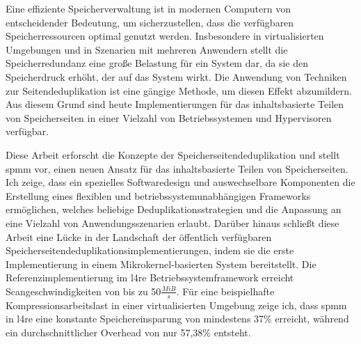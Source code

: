 Eine effiziente Speicherverwaltung ist in modernen Computern von entscheidender Bedeutung, um sicherzustellen, dass die verfügbaren Speicherressourcen optimal genutzt werden.
Insbesondere in virtualisierten Umgebungen und in Szenarien mit mehreren Anwendern stellt die Speicherredundanz eine große Belastung für ein System dar, da sie den Speicherdruck erhöht, der auf das System wirkt.
Die Anwendung von Techniken zur Seitendeduplikation ist eine gängige Methode, um diesen Effekt abzumildern.
Aus diesem Grund sind heute Implementierungen für das inhaltsbasierte Teilen von Speicherseiten in einer Vielzahl von Betriebssystemen und Hypervisoren verfügbar.

Diese Arbeit erforscht die Konzepte der Speicherseitendeduplikation und stellt \acs{spmm} vor, einen neuen Ansatz für das inhaltsbasierte Teilen von Speicherseiten.
Ich zeige, dass ein spezielles Softwaredesign und auswechselbare Komponenten die Erstellung eines flexiblen und betriebssystemunabhängigen Frameworks ermöglichen, welches beliebige Deduplikationsstrategien und die Anpassung an eine Vielzahl von Anwendungsszenarien erlaubt.
Darüber hinaus schließt diese Arbeit eine Lücke in der Landschaft der öffentlich verfügbaren Speicherseitendeduplikationsimplementierungen, indem sie die erste Implementierung in einem Mikrokernel-basierten System bereitstellt.
Die Referenzimplementierung im \acs{l4re} Betriebssystemframework erreicht Scangeschwindigkeiten von bis zu 50$\frac{MiB}{s}$.
Für eine beispielhafte Kompressionsarbeitslast in einer virtualisierten Umgebung zeige ich, dass \acs{spmm} in \acs{l4re} eine konstante Speichereinsparung von mindestens 37\% erreicht, während ein durchschnittlicher Overhead von nur 57,38\% entsteht.
